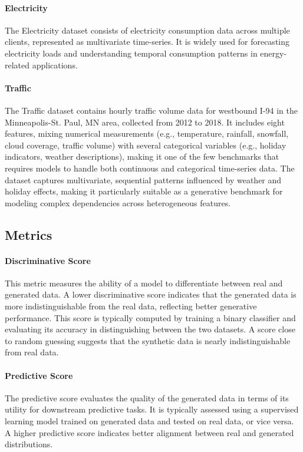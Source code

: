 \documentclass{article}
\theoremstyle{plain}
\theoremstyle{definition}
\theoremstyle{remark}
\begin{document}
\paragraph{Electricity} 
The Electricity dataset consists of electricity consumption data across multiple clients, represented as multivariate time-series. It is widely used for forecasting electricity loads and understanding temporal consumption patterns in energy-related applications.

\paragraph{Traffic} 
The Traffic dataset \cite{metro_interstate_traffic_volume_492} contains hourly traffic volume data for westbound I-94 in the Minneapolis-St. Paul, MN area, collected from 2012 to 2018. It includes eight features, mixing numerical measurements (e.g., temperature, rainfall, snowfall, cloud coverage, traffic volume) with several categorical variables (e.g., holiday indicators, weather descriptions), making it one of the few benchmarks that requires models to handle both continuous and categorical time-series data. The dataset captures multivariate, sequential patterns influenced by weather and holiday effects, making it particularly suitable as a generative benchmark for modeling complex dependencies across heterogeneous features.


\subsection{Metrics}
\label{app:metrics}

\paragraph{Discriminative Score} 
This metric measures the ability of a model to differentiate between real and generated data. A lower discriminative score indicates that the generated data is more indistinguishable from the real data, reflecting better generative performance. 
This score is typically computed by training a binary classifier and evaluating its accuracy in distinguishing between the two datasets. A score close to random guessing suggests that the synthetic data is nearly indistinguishable from real data.

\paragraph{Predictive Score} 
The predictive score evaluates the quality of the generated data in terms of its utility for downstream predictive tasks. It is typically assessed using a supervised learning model trained on generated data and tested on real data, or vice versa. A higher predictive score indicates better alignment between real and generated distributions.
\end{document}
